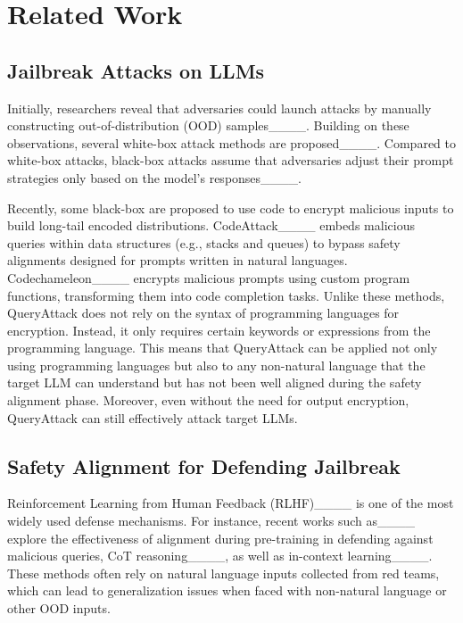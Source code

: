 \section{Related Work}
\label{sec:related work}

\subsection{Jailbreak Attacks on LLMs}
Initially, researchers reveal that adversaries could launch attacks by manually constructing out-of-distribution (OOD) samples____.
Building on these observations, several white-box attack methods are proposed____. 
Compared to white-box attacks, black-box attacks assume that adversaries   adjust their prompt strategies only based on the model's responses____. 

Recently, some black-box are proposed to use code to encrypt malicious inputs to build long-tail encoded distributions. 
CodeAttack____ embeds malicious queries within data structures (e.g., stacks and queues) to bypass safety alignments designed for prompts written in natural languages. 
Codechameleon____ encrypts malicious prompts using custom program functions, transforming them into code completion tasks.
Unlike these methods, QueryAttack does not rely on the syntax of programming languages for encryption. Instead, it only requires certain keywords or expressions from the programming language. This means that QueryAttack can be applied not only using programming languages but also to any non-natural language that the target LLM can understand but has not been well aligned during the safety alignment phase. Moreover, even without the need for output encryption, QueryAttack can still effectively attack target LLMs.

\subsection{Safety Alignment for Defending Jailbreak}
Reinforcement Learning from Human Feedback (RLHF)____ is one of the most widely used defense mechanisms. For instance, recent works such as____ explore the effectiveness of alignment during pre-training in defending against malicious queries, CoT reasoning____, as well as in-context learning____.  
These methods often rely on natural language inputs collected from red teams, which can lead to generalization issues when faced with non-natural language or other OOD inputs. 

